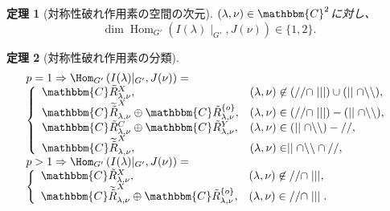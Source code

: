 \documentclass[notes,notheorems]{beamer}
\newcommand{\nin}{\not\in}
\newcommand{\tmop}[1]{\ensuremath{\operatorname{#1}}}
\newtheorem{theorem}{定理}
\theoremstyle{definition}
\theoremstyle{example}
\theoremstyle{remark}
\theoremstyle{mystyle}
\begin{document}
\begin{frame}{}
	\begin{theorem}[対称性破れ作用素の空間の次元]
$(\lambda, \nu) \in \mathbbm{C}^2$に対し、
\begin{equation*}
\dim \tmop{Hom}_{G'} (I (\lambda) \mid_{G'}, J
(\nu)) \in \{ 1, 2 \}.
\end{equation*}
	\end{theorem}
	\begin{theorem}[対称性破れ作用素の分類]
		\begin{equation*}
			\begin{array}[]{l}
				p=1\Rightarrow \Hom_{G'}\left( I(\lambda)\kern-0.1cm\mid_{G'},J(\nu) \right)=\\
				\left\{  \begin{array}[]{ll}
  \mathbbm{C} \tilde{R}_{\lambda, \nu}^X, & (\lambda, \nu) \nin (/ / \cap \mid
  \mid \mid) \cup (\mid \mid \cap \backslash\backslash),\\
  \mathbbm{C} \widetilde{\tilde{R}}_{\lambda, \nu}^X \oplus \mathbbm{C}
  \tilde{R}_{\lambda, \nu}^{\{ o \}}, & (\lambda, \nu) \in (/ / \cap \mid \mid
  \mid) - (\mid \mid \cap \backslash\backslash),\\
  \mathbbm{C} \tilde{R}_{\lambda, \nu}^C \oplus \mathbbm{C}
  \tilde{R}^Y_{\lambda, \nu}, & (\lambda, \nu) \in (\mid \mid \cap
  \backslash\backslash) - / /,\\
  \mathbbm{C} \widetilde{\tilde{R}}_{\lambda, \nu}^X, & (\lambda, \nu) \in
  \mid \mid \cap \backslash\backslash \cap / /,
				\end{array}
					\right.\\
				p>1\Rightarrow \Hom_{G'}\left( I(\lambda)\kern-0.1cm\mid_{G'},J(\nu) \right)=\\
				\left\{  \begin{array}[]{ll}
  \mathbbm{C} \tilde{R}_{\lambda, \nu}^X, & (\lambda, \nu) \nin / / \cap \mid
  \mid \mid,\\
  \mathbbm{C} \widetilde{\tilde{R}}_{\lambda, \nu}^X \oplus \mathbbm{C}
  \tilde{R}_{\lambda, \nu}^{\{ o \}}, & (\lambda, \nu) \in / / \cap \mid \mid
  \mid.
				\end{array}
					\right.\\
			\end{array}
		\end{equation*}
	\end{theorem}
\end{frame}
\end{document}
